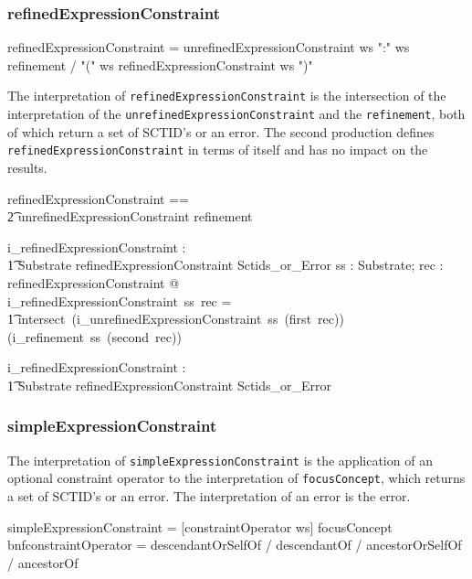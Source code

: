 \documentclass{article}
\def\spec#1{{\tt #1}}
\def\bnf#1{{\scriptsize {{#1}} }}
\begin{document}
\subsubsection{refinedExpressionConstraint}
\begin{framed}
\noindent
\bnf{refinedExpressionConstraint = unrefinedExpressionConstraint ws ":" ws refinement / "(" ws refinedExpressionConstraint ws ")"}
\end{framed}

The interpretation of \spec{refinedExpressionConstraint} is the intersection of the interpretation of
the \spec{unrefinedExpressionConstraint} and the \spec{refinement}, both of which return a set of SCTID's or
an error.  The second production defines \spec{refinedExpressionConstraint} in terms of itself and has no impact on the results.

\begin{zed}
refinedExpressionConstraint == \\
\t2 unrefinedExpressionConstraint \cross refinement \\
\end{zed}

\begin{gendef}
   i\_refinedExpressionConstraint : \\
\t1 Substrate \fun refinedExpressionConstraint \fun Sctids\_or\_Error
\where
   \forall ss : Substrate; rec : refinedExpressionConstraint @ \\
   i\_refinedExpressionConstraint~ss~rec = \\
\t1 intersect~(i\_unrefinedExpressionConstraint~ss~(first~rec)) (i\_refinement~ss~(second~rec))
\end{gendef}

\begin{gendef}
   i\_refinedExpressionConstraint : \\
\t1 Substrate \fun refinedExpressionConstraint \fun Sctids\_or\_Error
\end{gendef}


\subsubsection{simpleExpressionConstraint}
The interpretation of  \spec{simpleExpressionConstraint} is the application of an optional constraint 
operator to the interpretation of \spec{focusConcept}, which returns a set of SCTID's or an error.
The interpretation of an error is the error.


\begin{framed}
\noindent
\bnf{simpleExpressionConstraint =  [constraintOperator ws] focusConcept} \\
bnf{constraintOperator = descendantOrSelfOf / descendantOf /  ancestorOrSelfOf / ancestorOf}
\end{framed}
\end{document}
